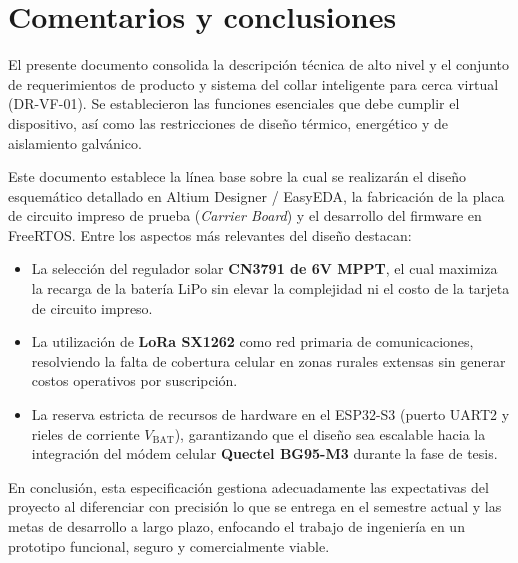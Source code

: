 \section*{Comentarios y conclusiones}

El presente documento consolida la descripción técnica de alto nivel y el conjunto de requerimientos de producto y sistema del collar inteligente para cerca virtual (DR-VF-01). Se establecieron las funciones esenciales que debe cumplir el dispositivo, así como las restricciones de diseño térmico, energético y de aislamiento galvánico.

Este documento establece la línea base sobre la cual se realizarán el diseño esquemático detallado en Altium Designer / EasyEDA, la fabricación de la placa de circuito impreso de prueba (\emph{Carrier Board}) y el desarrollo del firmware en FreeRTOS. Entre los aspectos más relevantes del diseño destacan:
\begin{itemize}[leftmargin=*]
    \item La selección del regulador solar \textbf{CN3791 de 6V MPPT}, el cual maximiza la recarga de la batería LiPo sin elevar la complejidad ni el costo de la tarjeta de circuito impreso.
    \item La utilización de \textbf{LoRa SX1262} como red primaria de comunicaciones, resolviendo la falta de cobertura celular en zonas rurales extensas sin generar costos operativos por suscripción.
    \item La reserva estricta de recursos de hardware en el ESP32-S3 (puerto UART2 y rieles de corriente $V_{\text{BAT}}$), garantizando que el diseño sea escalable hacia la integración del módem celular \textbf{Quectel BG95-M3} durante la fase de tesis.
\end{itemize}

En conclusión, esta especificación gestiona adecuadamente las expectativas del proyecto al diferenciar con precisión lo que se entrega en el semestre actual y las metas de desarrollo a largo plazo, enfocando el trabajo de ingeniería en un prototipo funcional, seguro y comercialmente viable.